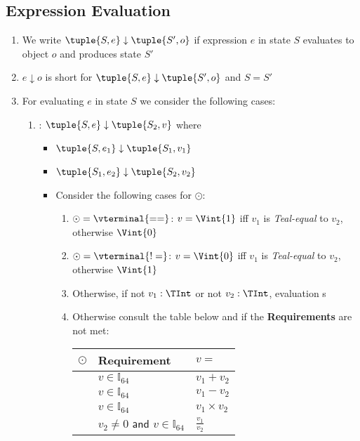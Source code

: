 \subsection{Expression Evaluation}\label{sec:eeval}
\begin{enumerate}
\item We write $\tuple{S,e} \downarrow \tuple{S',o}$ if expression $e$ in state $S$ evaluates to object $o$ and produces state $S'$
\item $e \downarrow o$ is short for $\tuple{S,e} \downarrow \tuple{S',o}$ and $S = S'$
\item For evaluating $e$ in state $S$ we consider the following cases:
  \begin{enumerate}
  \item {}: $\tuple{S, e} \downarrow \tuple{S_2, v}$ where
    \begin{itemize}
      \item $\tuple{S, e_1} \downarrow \tuple{S_1, v_1}$
      \item $\tuple{S_1, e_2} \downarrow \tuple{S_2, v_2}$
      \item Consider the following cases for $\odot$:
        \begin{enumerate}
          \item $\odot = \vterminal{==}$: $v = \Vint{1}$ iff $v_1$ is \emph{Teal-equal} to $v_2$, otherwise $\Vint{0}$
          \item $\odot = \vterminal{!=}$: $v = \Vint{0}$ iff $v_1$ is \emph{Teal-equal} to $v_2$, otherwise $\Vint{1}$
          \item Otherwise, if not $v_1 : \TInt$ or not $v_2 : \TInt$, evaluation \fail{}s
          \item Otherwise consult the table below and \fail{} if the \textbf{Requirements} are not met:\\
            \begin{tabular}{|l|l|l|}
              \hline
              $\odot$ & \textbf{Requirement} & $v = $\\
              \hline
              \hline
              \vterminal{+}	& $v \in \mathbb{I}_{64}$			& $v_1 + v_2$ \\
              \hline
              \vterminal{-}	& $v \in \mathbb{I}_{64}$			& $v_1 - v_2$ \\
              \hline
              \vterminal{*}	& $v \in \mathbb{I}_{64}$			& $v_1 \times v_2$ \\
              \hline
              \vterminal{/}	& $v_2 \ne 0 \textsf{ and }v \in \mathbb{I}_{64}$		& $\frac{v_1}{v_2}$ \\

\end{tabular}
\end{enumerate}
\end{itemize}
\end{enumerate}
\end{enumerate}
